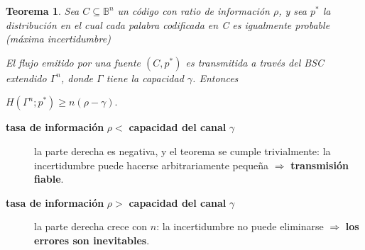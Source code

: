 \documentclass{beamer}
\theoremstyle{plain}
\newtheorem{teorema} [Teorema] {Teorema}
\theoremstyle{example}
\theoremstyle{example}
\begin{document}
\begin{frame}  \small  


\begin{teorema}
Sea $C \subseteq \mathbb{B}^n$ un código con ratio de información $\rho$, y sea $p^*$ la distribución en el cual cada palabra codificada en C es igualmente probable (máxima incertidumbre) 
\vspace{0.15cm}

El flujo emitido por una fuente $(C,p^*)$ es transmitida a través del BSC extendido $\Gamma^n$, donde $\Gamma$ tiene la capacidad $\gamma$. Entonces 

\begin{center}
$H(\Gamma^n;p^*) \geq n(\rho-\gamma).$
\end{center}

\end{teorema}

\begin{description}
  \item [\textbf{tasa de información} $\rho <$ \textbf{capacidad del canal} $\gamma$] la parte derecha es negativa, y el teorema se cumple trivialmente: la incertidumbre puede hacerse arbitrariamente pequeña $\Rightarrow$ \textbf{transmisión fiable}.
  \item [\textbf{tasa de información} $\rho >$ \textbf{capacidad del canal} $\gamma$] la parte derecha crece con $n$:
  la incertidumbre no puede eliminarse $\Rightarrow$ \textbf{los errores son inevitables}.
\end{description}

\end{frame} 
\end{document}
